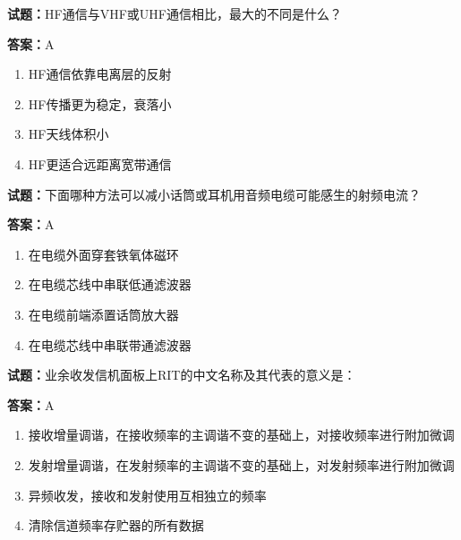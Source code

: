 \documentclass{ctexbook}
\begin{document}




\vspace{1em}

\textbf{试题：}HF通信与VHF或UHF通信相比，最大的不同是什么？ 

\textbf{答案：}A 

\begin{enumerate}[leftmargin=3em]
  \item HF通信依靠电离层的反射 

  \item HF传播更为稳定，衰落小 

  \item HF天线体积小 

  \item HF更适合远距离宽带通信 

\end{enumerate}






\vspace{1em}

\textbf{试题：}下面哪种方法可以减小话筒或耳机用音频电缆可能感生的射频电流？ 

\textbf{答案：}A 

\begin{enumerate}[leftmargin=3em]
  \item 在电缆外面穿套铁氧体磁环 

  \item 在电缆芯线中串联低通滤波器 

  \item 在电缆前端添置话筒放大器 

  \item 在电缆芯线中串联带通滤波器 

\end{enumerate}





\vspace{1em}

\textbf{试题：}业余收发信机面板上RIT的中文名称及其代表的意义是： 

\textbf{答案：}A 

\begin{enumerate}[leftmargin=3em]
  \item 接收增量调谐，在接收频率的主调谐不变的基础上，对接收频率进行附加微调 

  \item 发射增量调谐，在发射频率的主调谐不变的基础上，对发射频率进行附加微调 

  \item 异频收发，接收和发射使用互相独立的频率 

  \item 清除信道频率存贮器的所有数据 

\end{enumerate}
\end{document}
